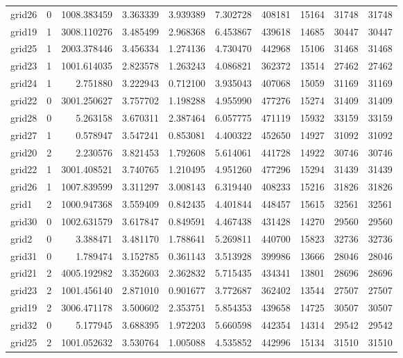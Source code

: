 \begin{longtable}{|l|r|r|r|r|r|r|r|r|r|}
grid26 & 0 & 1008.383459 & 3.363339 & 3.939389 & 7.302728 & 408181 & 15164 & 31748 & 31748 \\
grid19 & 1 & 3008.110276 & 3.485499 & 2.968368 & 6.453867 & 439618 & 14685 & 30447 & 30447 \\
grid25 & 1 & 2003.378446 & 3.456334 & 1.274136 & 4.730470 & 442968 & 15106 & 31468 & 31468 \\
grid23 & 1 & 1001.614035 & 2.823578 & 1.263243 & 4.086821 & 362372 & 13514 & 27462 & 27462 \\
grid24 & 1 & 2.751880 & 3.222943 & 0.712100 & 3.935043 & 407068 & 15059 & 31169 & 31169 \\
grid22 & 0 & 3001.250627 & 3.757702 & 1.198288 & 4.955990 & 477276 & 15274 & 31409 & 31409 \\
grid28 & 0 & 5.263158 & 3.670311 & 2.387464 & 6.057775 & 471119 & 15932 & 33159 & 33159 \\
grid27 & 1 & 0.578947 & 3.547241 & 0.853081 & 4.400322 & 452650 & 14927 & 31092 & 31092 \\
grid20 & 2 & 2.230576 & 3.821453 & 1.792608 & 5.614061 & 441728 & 14922 & 30746 & 30746 \\
grid22 & 1 & 3001.408521 & 3.740765 & 1.210495 & 4.951260 & 477296 & 15294 & 31439 & 31439 \\
grid26 & 1 & 1007.839599 & 3.311297 & 3.008143 & 6.319440 & 408233 & 15216 & 31826 & 31826 \\
grid1 & 2 & 1000.947368 & 3.559409 & 0.842435 & 4.401844 & 448457 & 15615 & 32561 & 32561 \\
grid30 & 0 & 1002.631579 & 3.617847 & 0.849591 & 4.467438 & 431428 & 14270 & 29560 & 29560 \\
grid2 & 0 & 3.388471 & 3.481170 & 1.788641 & 5.269811 & 440700 & 15823 & 32736 & 32736 \\
grid31 & 0 & 1.789474 & 3.152785 & 0.361143 & 3.513928 & 399986 & 13666 & 28046 & 28046 \\
grid21 & 2 & 4005.192982 & 3.352603 & 2.362832 & 5.715435 & 434341 & 13801 & 28696 & 28696 \\
grid23 & 2 & 1001.456140 & 2.871010 & 0.901677 & 3.772687 & 362402 & 13544 & 27507 & 27507 \\
grid19 & 2 & 3006.471178 & 3.500602 & 2.353751 & 5.854353 & 439658 & 14725 & 30507 & 30507 \\
grid32 & 0 & 5.177945 & 3.688395 & 1.972203 & 5.660598 & 442354 & 14314 & 29542 & 29542 \\
grid25 & 2 & 1001.052632 & 3.530764 & 1.005088 & 4.535852 & 442996 & 15134 & 31510 & 31510 \\

\end{longtable}
